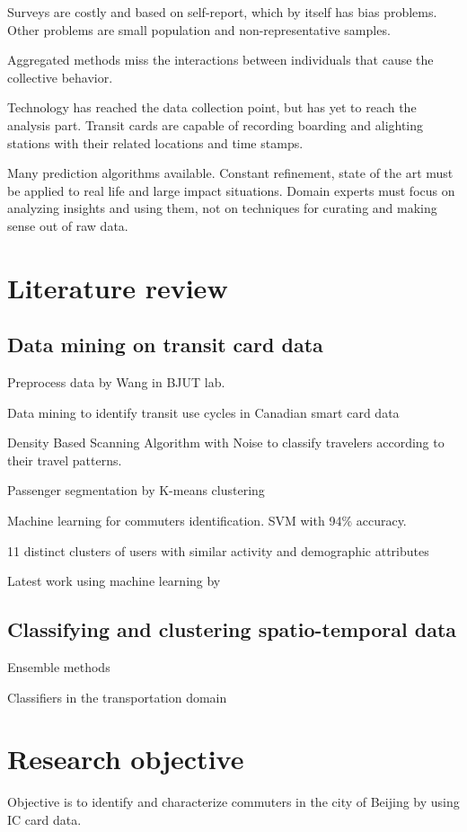 \documentclass{article}
\begin{document}
Surveys are costly and based on self-report, which by itself has bias problems. Other problems are small population and non-representative samples. 

Aggregated methods miss the interactions between individuals that cause the collective behavior. 

Technology has reached the data collection point, but has yet to reach the analysis part. Transit cards are capable of recording boarding and alighting stations with their related locations and time stamps. 

Many prediction algorithms available. Constant refinement, state of the art must be applied to real life and large impact situations. Domain experts must focus on analyzing insights and using them, not on techniques for curating and making sense out of raw data. 


\section{Literature review}

\subsection{Data mining on transit card data}
Preprocess data by Wang in BJUT lab. \cite{wang2014research}

Data mining to identify transit use cycles in Canadian smart card data \cite{morency2007measuring}

Density Based Scanning Algorithm with Noise to classify travelers according to their travel patterns.  \cite{ma2013mining}

Passenger segmentation by K-means clustering \cite{bhaskar2015passenger}

Machine learning for commuters identification. SVM with 94\% accuracy. \cite{tu2016impact}

11 distinct clusters of users with similar activity and demographic attributes \cite{langlois2016inferring}

Latest work using machine learning by \cite{ma2017understanding}

\subsection{Classifying and clustering spatio-temporal data}
Ensemble methods

Classifiers in the transportation domain

\section{Research objective}
Objective is to identify and characterize commuters in the city of Beijing by using IC card data.
\end{document}
